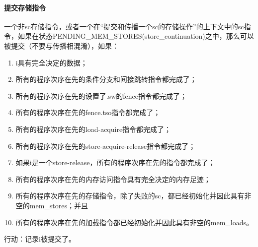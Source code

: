 \paragraph{提交存储指令}\label{omm:commit_stores}
一个非sc存储指令，或者一个在“提交和传播一个sc的存储操作”的上下文中的sc指令，如果在状态PENDING_MEM_STORES(store_continuation)之中，那么可以被提交（不要与传播相混淆），如果：
\begin{enumerate}
\item i具有完全决定的数据； %
\item 所有的程序次序在先的条件分支和间接跳转指令都完成了； %
\item 所有的程序次序在先的设置了.sw的fence指令都完成了； %
\item 所有的程序次序在先的fence.tso指令都完成了； %
\item 所有的程序次序在先的load-acquire指令都完成了； %
\item 所有的程序次序在先的store-acquire-release指令都完成了； %
\item 如果i是一个store-release，所有的程序次序在先的指令都完成了； %
\item\label{omm:commit_store:prev_addrs} 所有的程序次序在先的内存访问指令具有完全决定的内存足迹； %
\item\label{omm:commit_store:prev_stores} 所有的程序次序在先的存储指令，除了失败的sc，都已经初始化并因此具有非空的mem_stores；并且  %
\item\label{omm:commit_store:prev_loads} 所有的程序次序在先的加载指令都已经初始化并因此具有非空的mem_loads。 %
\end{enumerate}
行动：记录i被提交了。

